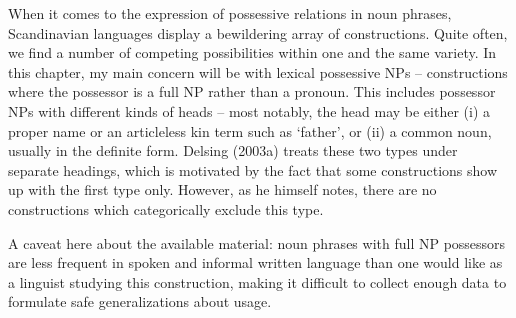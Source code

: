 When it comes to the expression of possessive relations in noun phrases, Scandinavian languages display a bewildering array of constructions. Quite often, we find a number of competing possibilities within one and the same variety. In this chapter, my main concern will be with lexical possessive NPs – constructions where the possessor is a full NP rather than a pronoun. This includes possessor NPs with different kinds of heads – most notably, the head may be either (i) a proper name or an articleless kin term such as ‘father’, or (ii) a common noun, usually in the definite form. Delsing (2003a) treats these two types under separate headings, which is motivated by the fact that some constructions show up with the first type only. However, as he himself notes, there are no constructions which categorically exclude this type. 

A caveat here about the available material: noun phrases with full NP possessors are less frequent in spoken and informal written language than one would like as a linguist studying this construction, making it difficult to collect enough data to formulate safe generalizations about usage. 

